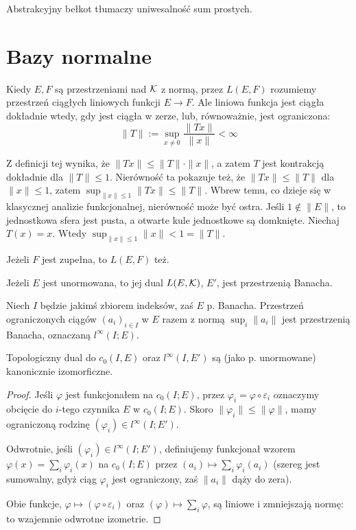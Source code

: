 Abstrakcyjny bełkot tłumaczy uniwesalność sum prostych.

\section{Bazy normalne}
Kiedy $E, F$ są przestrzeniami nad $\mathcal K$ z normą, przez $L(E, F)$ rozumiemy przestrzeń ciągłych liniowych funkcji $E \to F$.
Ale liniowa funkcja jest ciągła dokładnie wtedy, gdy jest ciągła w zerze, lub, równoważnie, jest ograniczona:
\[
	\|T\| := \sup_{x \neq 0} \frac{\|T x\|}{\|x\|} < \infty
\]

Z definicji tej wynika, że $\|Tx\| \le \|T\| \cdot \|x\|$, a zatem $T$ jest kontrakcją dokładnie dla $\|T\| \le 1$.
Nierówność ta pokazuje też, że $\|Tx\| \le \|T\|$ dla $\|x\| \le 1$, zatem $\sup_{\|x\| \le 1} \|Tx\| \le \|T\|$.
Wbrew temu, co dzieje się w klasycznej analizie funkcjonalnej, nierówność może być ostra.
Jeśli $1 \not \in \|E\|$, to jednostkowa sfera jest pusta, a otwarte kule jednostkowe są domknięte.
Niechaj $T(x) = x$. Wtedy $\sup_{\|x\| \le 1}\|x\| < 1 = \|T\|$.

\begin{fakt}
	Jeżeli $F$ jest zupełna, to $L(E, F)$ też.
\end{fakt}

\begin{wniosek}
	Jeżeli $E$ jest unormowana, to jej dual $L(E, \mathcal K)$, $E'$, jest przestrzenią Banacha.
\end{wniosek}

Niech $I$ będzie jakimś zbiorem indeksów, zaś $E$ p. Banacha.
Przestrzeń ograniczonych ciągów $(a_i)_{i \in I}$ w $E$ razem z normą $\sup_i \|a_i\|$ jest przestrzenią Banacha, oznaczaną $l^\infty(I; E)$.

\begin{fakt}
	Topologiczny dual do $c_0(I, E)$ oraz $l^\infty(I, E')$ są (jako p. unormowane) kanonicznie izomorficzne.
\end{fakt}

\begin{proof}
	Jeśli $\varphi$ jest funkcjonałem na $c_0(I; E)$, przez $\varphi_i = \varphi \circ \varepsilon_i$ oznaczymy obcięcie do $i$-tego czynnika $E$ w $c_0(I; E)$.
	Skoro $\|\varphi_i\| \le \|\varphi\|$, mamy ograniczoną rodzinę $(\varphi_i) \in l^\infty(I; E')$.

	Odwrotnie, jeśli $(\varphi_i) \in l^\infty (I; E')$, definiujemy funkcjonał wzorem $\varphi(x) = \sum_i \varphi_i(x)$ na $c_0(I; E)$ przez $(a_i) \mapsto \sum_i \varphi_i (a_i)$ (szereg jest sumowalny, gdyż ciąg $\varphi_i$ jest ograniczony, zaś $\|a_i\|$ dąży do zera).

	Obie funkcje, $\varphi \mapsto (\varphi \circ \varepsilon_i)$ oraz $(\varphi) \mapsto \sum_i \varphi$, są liniowe i zmniejszają normę: to wzajemnie odwrotne izometrie.
\end{proof}

